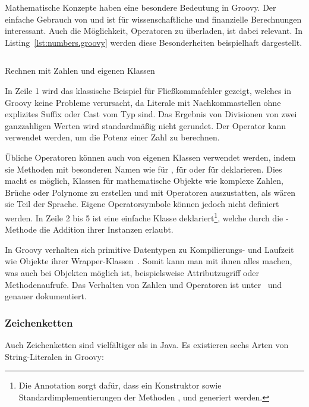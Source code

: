 \documentclass[a4paper]{article}
\newcommand{\codelisting}[3]{\begin{listing}[htp]
	\inputminted{#1}{#1/#2}
	\vspace{-3ex}
	\caption{#3}
	\label{lst:#2}
\end{listing}}
\begin{document}
Mathematische Konzepte haben eine besondere Bedeutung in Groovy.
Der einfache Gebrauch von \break{} und  ist für wissenschaftliche und finanzielle Berechnungen interessant.
Auch die Möglichkeit, Operatoren zu überladen, ist dabei relevant.
In Listing~\ref{lst:numbers.groovy} werden diese Besonderheiten beispielhaft dargestellt.

\codelisting{groovy}{numbers.groovy}{Rechnen mit Zahlen und eigenen Klassen}

In Zeile 1 wird das klassische Beispiel für Fließkommafehler gezeigt, welches in Groovy keine Probleme verursacht, da Literale mit Nachkommastellen ohne explizites Suffix oder Cast vom Typ  sind.
Das Ergebnis von Divisionen von zwei ganzzahligen Werten wird standardmäßig nicht gerundet.
Der Operator \code{**} kann verwendet werden, um die Potenz einer Zahl zu berechnen.

Übliche Operatoren können auch von eigenen Klassen verwendet werden, indem sie Methoden mit besonderen Namen wie  für \code{+},  für \code{<<} oder  für \code{++} deklarieren.
Dies macht es möglich, Klassen für mathematische Objekte wie komplexe Zahlen, Brüche oder Polynome zu erstellen und mit Operatoren auszustatten, als wären sie Teil der Sprache.
Eigene Operatorsymbole können jedoch nicht definiert werden.
In Zeile 2 bis 5 ist eine einfache Klasse  deklariert\footnote{Die Annotation  sorgt dafür, dass ein Konstruktor sowie Standardimplementierungen der Methoden ,  und  generiert werden.}, welche durch die -Methode die Addition ihrer Instanzen erlaubt.

In Groovy verhalten sich primitive Datentypen zu Kompilierungs- und Laufzeit wie Objekte ihrer Wrapper-Klassen~\cite[Abs.~3.2.10.]{groovy-lang:documentation}.
Somit kann man mit ihnen alles machen, was auch bei Objekten möglich ist, beispielsweise Attributzugriff oder Methodenaufrufe.
Das Verhalten von Zahlen und Operatoren ist unter~\cite[Abs.~1.1.5.]{groovy-lang:documentation} und~\cite[Abs.~1.2.]{groovy-lang:documentation} genauer dokumentiert.

\subsubsection{Zeichenketten}\label{subsubsec:strings}

Auch Zeichenketten sind vielfältiger als in Java.
Es existieren sechs Arten von String-Literalen in Groovy:
\end{document}
